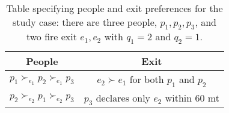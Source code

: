 \begin{table}[!htb]
    \centering
    \begin{tabular}{c|c}
        \hline People                                             & Exit                                                       \\
        \hline\( p_{1} \succ_{e_{1}} p_{2} \succ_{e_{1}} p_{3} \) & \( e_{2} \succ e_{1} \) for both \( p_{1} \) and \( p_{2} \) \\
        \( p_{2} \succ_{e_{2}} p_{1} \succ_{e_{2}} p_{3} \)       & \( p_{3} \) declares only \( e_{2} \) within 60 mt         \\
        \hline
    \end{tabular}
    \caption{Table specifying people and exit preferences for
        the study case: there are three people, \( p_1, p_2, p _ { 3 } \), and two fire exit
        \( e_1, e_2\) with \( q_1= 2 \) and \( q_2= 1 \).}
    \label{tab:people-exit}
\end{table}